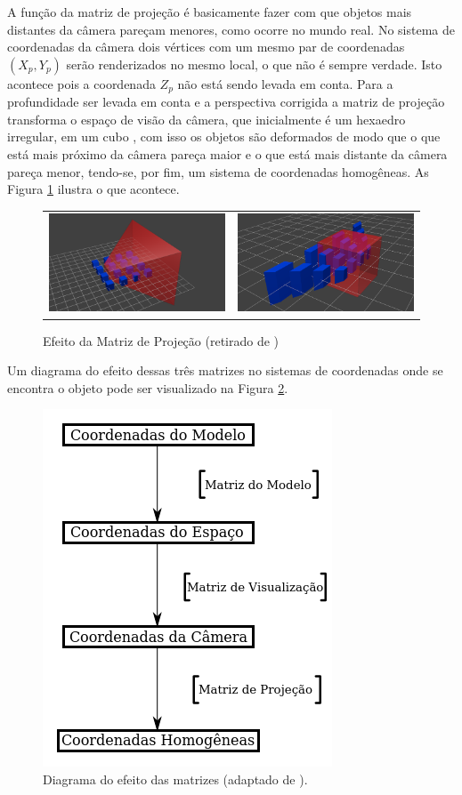 {A função da matriz de projeção é basicamente fazer com que objetos mais
distantes da câmera pareçam menores, como ocorre no mundo real. No sistema de
coordenadas da câmera dois vértices com um mesmo par de coordenadas $(X_p,Y_p)$
serão renderizados no mesmo local, o que não é sempre verdade. Isto acontece
pois a coordenada $Z_p$ não está sendo levada em conta. Para a profundidade ser
levada em conta e a perspectiva corrigida a matriz de projeção transforma o
espaço de visão da câmera, que inicialmente é um hexaedro irregular, em um cubo
\cite{openGlTutorial}, com isso os objetos são deformados de modo que o que está
mais próximo da câmera pareça maior e o que está mais distante da câmera pareça
menor, tendo-se, por fim, um sistema de coordenadas homogêneas. As Figura
\ref{fig:mat_proj} ilustra o que acontece.

\begin{figure}[!htb]
   \centering
\begin{tabular}{cc}
\includegraphics[width=0.4\linewidth]{./figs/TG_projection_matrix_1.png}&
\includegraphics[width=0.4\linewidth]{./figs/TG_projection_matrix_2.png}
\end{tabular}
    \caption{Efeito da Matriz de Projeção (retirado de \cite{openGlTutorial})}
    \label{fig:mat_proj}
\end{figure}

Um diagrama do efeito dessas três matrizes no sistemas de coordenadas onde se
encontra o objeto pode ser visualizado na Figura \ref{fig:mat_diagrama}.

\begin{figure}[h!]
\centering
\includegraphics[width=.45\linewidth]{figs/TG_matrices_diagram_pt.png}
\caption{Diagrama do efeito das matrizes (adaptado de \cite{openGlTutorial}).}
\label{fig:mat_diagrama}
\end{figure}

}
